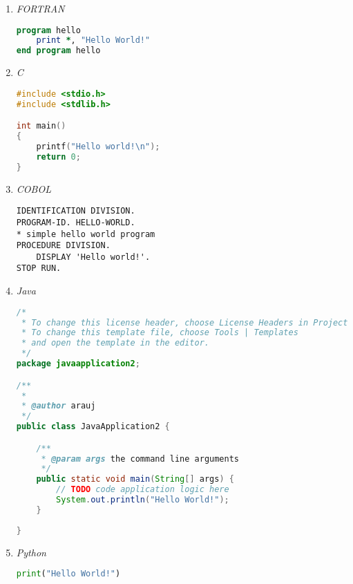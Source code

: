 \documentclass[conference]{IEEEtran}
\begin{document}
\begin{enumerate}[I]

\item \textit{FORTRAN}

\begin{lstlisting}[language=Fortran, caption=Exemplo em \textit{FORTRAN}]
program hello
    print *, "Hello World!"
end program hello
\end{lstlisting}


\item \textit{C}

\begin{lstlisting}[language=C, caption=Exemplo em \textit{C}]
#include <stdio.h>
#include <stdlib.h>

int main()
{
    printf("Hello world!\n");
    return 0;
}
\end{lstlisting}


\item \textit{COBOL}

\begin{lstlisting}[language=Cobol, caption=Exemplo em \textit{COBOL}]
IDENTIFICATION DIVISION.
PROGRAM-ID. HELLO-WORLD.
* simple hello world program
PROCEDURE DIVISION.
    DISPLAY 'Hello world!'.
STOP RUN.
\end{lstlisting}

\item \textit{Java}

\begin{lstlisting}[language=Java, caption=Exemplo em \textit{Java}]
/*
 * To change this license header, choose License Headers in Project Properties.
 * To change this template file, choose Tools | Templates
 * and open the template in the editor.
 */
package javaapplication2;

/**
 *
 * @author arauj
 */
public class JavaApplication2 {

    /**
     * @param args the command line arguments
     */
    public static void main(String[] args) {
        // TODO code application logic here
        System.out.println("Hello World!");
    }
    
}
\end{lstlisting}

\item \textit{Python}

\begin{lstlisting}[language=Python, caption=Exemplo em \textit{Python}]
print("Hello World!")
\end{lstlisting}


\end{enumerate}
\end{document}
